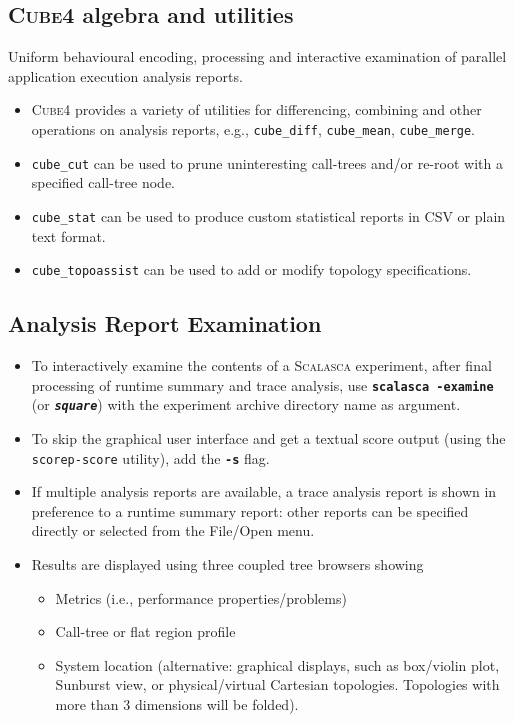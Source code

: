 \documentclass[a4paper]{article}
\newcommand{\Scalasca}{\textsc{Scalasca}\xspace}
\newcommand{\Cube}{\textsc{Cube}\xspace}
\begin{document}
\subsection*{\Cube{4} algebra and utilities}

Uniform behavioural encoding, processing and interactive examination of
parallel application execution analysis reports.

\begin{itemize}
  \item \Cube{4} provides a variety of utilities
  for differencing, combining and other operations on analysis reports, e.g.,
  \texttt{cube\_diff}, \texttt{cube\_mean}, \texttt{cube\_merge}.
  \item \texttt{cube\_cut} can be used to prune uninteresting
call-trees and/or re-root with a specified call-tree node.
  \item \texttt{cube\_stat} can be used to produce custom statistical reports in CSV or plain text format.
  \item \texttt{cube\_topoassist} can be used to add or modify topology specifications.
\end{itemize}

\clearpage


\subsection*{Analysis Report Examination}
\begin{itemize}
  \item To interactively examine the contents of a \Scalasca experiment,
        after final processing of runtime summary and trace analysis,
        use \textbf{\texttt{scalasca -examine}} (or \textbf{\texttt{\em square}}) with the
        experiment archive directory name as argument.
  \item To skip the graphical user interface and get a textual score output (using the
        \texttt{scorep-score} utility), add the \textbf{\texttt{-s}} flag.
  \item If multiple analysis reports are available,
        a trace analysis report is shown in preference to a runtime
        summary report: other reports can be specified directly or selected
        from the File/Open menu.
  \item Results are displayed using three coupled tree browsers showing
    \begin{itemize}
      \setlength{\itemsep}{0cm}
      \item Metrics (i.e., performance properties/problems)
      \item Call-tree or flat region profile
      \item System location (alternative: graphical displays, such as
            box/violin plot, Sunburst view, or physical/virtual Cartesian
            topologies. Topologies with more than 3 dimensions will be folded).
    \end{itemize}
\end{itemize}
\end{document}
